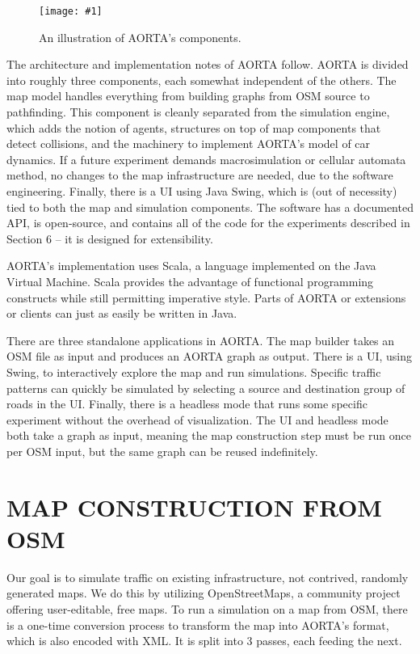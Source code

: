 \documentclass[letterpaper, 10 pt, conference]{ieeeconf}  %
\newcommand{\pix}[3]{
  \begin{figure}[h]
    \centering \texttt{[image: \#1]}
    \caption{#2}
  \end{figure}
}
\begin{document}
\pix{architecture.eps}{An illustration of AORTA's components.}{scale=0.3}

The architecture and implementation notes of AORTA follow. AORTA is divided into
roughly three components, each somewhat independent of the others. The map model
handles everything from building graphs from OSM source to pathfinding. This
component is cleanly separated from the simulation engine, which adds the notion
of agents, structures on top of map components that detect collisions, and the
machinery to implement AORTA's model of car dynamics. If a future experiment
demands macrosimulation or cellular automata method, no changes to the map
infrastructure are needed, due to the software engineering. Finally, there is a
UI using Java Swing, which is (out of necessity) tied to both the map and
simulation components. The software has a documented API, is open-source, and
contains all of the code for the experiments described in Section 6 -- it is
designed for extensibility.

AORTA's implementation uses Scala, a language implemented on the Java Virtual
Machine. Scala provides the advantage of functional programming constructs while
still permitting imperative style. Parts of AORTA or extensions or clients can
just as easily be written in Java.

There are three standalone applications in AORTA. The map builder takes an OSM
file as input and produces an AORTA graph as output. There is a UI, using Swing,
to interactively explore the map and run simulations. Specific traffic patterns
can quickly be simulated by selecting a source and destination group of roads in
the UI. Finally, there is a headless mode that runs some specific experiment
without the overhead of visualization. The UI and headless mode both take a
graph as input, meaning the map construction step must be run once per OSM
input, but the same graph can be reused indefinitely.


\section{MAP CONSTRUCTION FROM OSM}

Our goal is to simulate traffic on existing infrastructure, not contrived,
randomly generated maps. We do this by utilizing OpenStreetMaps, a community
project offering user-editable, free maps.  To run a simulation on a map from
OSM, there is a one-time conversion process to transform the map into AORTA's
format, which is also encoded with XML. It is split into 3 passes, each feeding
the next.
\end{document}
